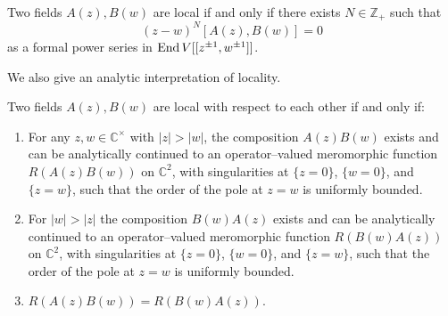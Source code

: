 \documentclass[12pt]{article}
\begin{document}
\begin{proposition}
    Two fields $A(z),B(w)$ are local if and only if there exists
    $N \in \mathbb{Z}_+$ such that
    \begin{equation}\label{eq:locality}
        (z-w)^N [A(z),B(w)] = 0
    \end{equation}
    as a formal power series in $\operatorname{End} V[[z^{\pm1},w^{\pm1}]]$.
\end{proposition}

We also give an analytic interpretation of locality.
\begin{proposition}
    Two fields $A(z),B(w)$ are local with respect to each other
    if and only if:
    \begin{enumerate}
        \item For any $z,w \in \mathbb{C}^\times$ with $|z| > |w|$,
              the composition $A(z)B(w)$ exists and can be analytically
              continued to an operator–valued meromorphic function
              $R(A(z)B(w))$ on $\mathbb{C}^2$, with singularities at
              $\{z=0\}$, $\{w=0\}$, and $\{z=w\}$, such that the order
              of the pole at $z=w$ is uniformly bounded.

        \item For $|w| > |z|$ the composition $B(w)A(z)$ exists and can
              be analytically continued to an operator–valued meromorphic
              function $R(B(w)A(z))$ on $\mathbb{C}^2$, with singularities
              at $\{z=0\}$, $\{w=0\}$, and $\{z=w\}$, such that the order
              of the pole at $z=w$ is uniformly bounded.

        \item $R(A(z)B(w)) = R(B(w)A(z))$.
    \end{enumerate}
\end{proposition}
\end{document}
